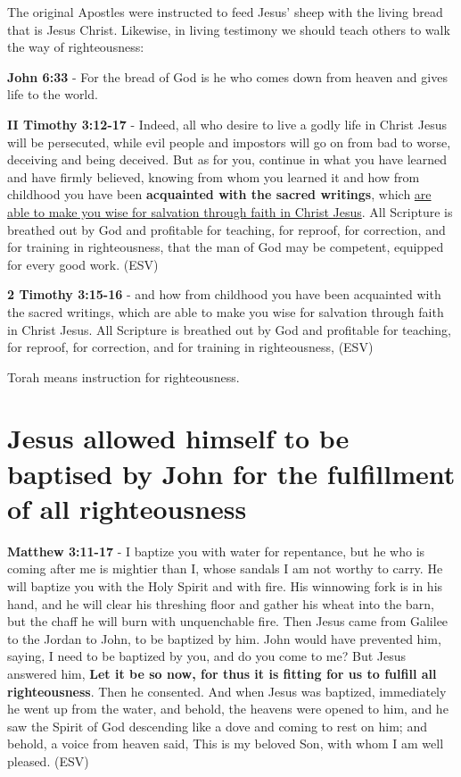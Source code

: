 \documentclass[11pt]{article}
\begin{document}
The original Apostles were instructed to feed Jesus' sheep with the living bread that is Jesus Christ. Likewise, in living testimony we should teach others to walk the way of righteousness:

\textbf{John 6:33} - For the bread of God is he who comes down from heaven and gives life to the world.

\textbf{II Timothy 3:12-17} - Indeed, all who desire to live a godly life in Christ Jesus will be persecuted, while evil people and impostors will go on from bad to worse, deceiving and being deceived. But as for you, continue in what you have learned and have firmly believed, knowing from whom you learned it and how from childhood you have been \textbf{acquainted with the sacred writings}, which \uline{are able to make you wise for salvation through faith in Christ Jesus}. All Scripture is breathed out by God and profitable for teaching, for reproof, for correction, and for training in righteousness, that the man of God may be competent, equipped for every good work. (ESV)

\textbf{2 Timothy 3:15-16} -  and how from childhood you have been acquainted with the sacred writings, which are able to make you wise for salvation through faith in Christ Jesus.  All Scripture is breathed out by God and profitable for teaching, for reproof, for correction, and for training in righteousness,  (ESV)

Torah means instruction for righteousness.

\section{Jesus allowed himself to be baptised by John for the fulfillment of all righteousness}
\label{sec:orgf09f20b}
\textbf{Matthew 3:11-17} - I baptize you with water for repentance, but he who is coming after me is mightier than I, whose sandals I am not worthy to carry. He will baptize you with the Holy Spirit and with fire.  His winnowing fork is in his hand, and he will clear his threshing floor and gather his wheat into the barn, but the chaff he will burn with unquenchable fire.  Then Jesus came from Galilee to the Jordan to John, to be baptized by him.  John would have prevented him, saying, I need to be baptized by you, and do you come to me?  But Jesus answered him, \textbf{Let it be so now, for thus it is fitting for us to fulfill all righteousness}. Then he consented.  And when Jesus was baptized, immediately he went up from the water, and behold, the heavens were opened to him, and he saw the Spirit of God descending like a dove and coming to rest on him; and behold, a voice from heaven said, This is my beloved Son, with whom I am well pleased. (ESV)
\end{document}
